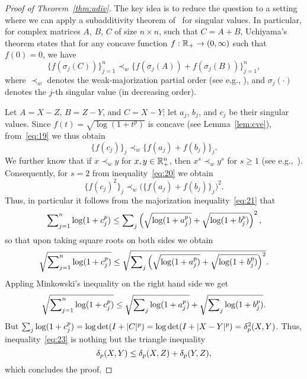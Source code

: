 \documentclass[11pt]{article}
\begin{document}
\begin{proof}[Proof of Theorem~{\ref{thm:adiv}}]
  The key idea is to reduce the question to a setting where we can apply a subadditivity theorem of~\citet{uchiyama2006} for singular values. In particular, for complex matrices $A$, $B$, $C$ of size $n\times n$, such that $C=A+B$, Uchiyama's theorem states that for any concave function $f: \mathbb{R}_+\to (0,\infty)$ such that $f(0)=0$, we have
  \begin{equation}
    \label{eq:19}
    \{f(\sigma_j(C))\}_{j=1}^n \prec_w \{f(\sigma_j(A))+ f(\sigma_j(B))\}_{j=1}^n,
  \end{equation}
  where $\prec_w$ denotes the weak-majorization partial order (see e.g., \citep[Chapter~2]{bhatia1997}), and $\sigma_j(\cdot)$ denotes the $j$-th singular value (in decreasing order).

  Let $A=X-Z$, $B=Z-Y$, and $C=X-Y$; let $a_j$, $b_j$, and $c_j$ be their singular values. Since $f(t)=\sqrt{\log(1+t^p)}$ is concave (see Lemma~\ref{lem:cve}), from~\eqref{eq:19} we thus obtain
  \begin{equation}
    \label{eq:20}
    \{f(c_j)\}_j \prec_w \{f(a_j) + f(b_j)\}_j.
  \end{equation}
  We further know that if $x \prec_w y$ for $x, y \in \mathbb{R}_+^n$, then $x^s \prec_w y^s$ for $s \ge 1$ (see e.g.,~\citep[Example II.3.5]{bhatia1997}). Consequently, for $s=2$ from inequality~\eqref{eq:20} we obtain
  \begin{equation}
    \label{eq:21}
    \{f(c_j)^2\}_j \prec_w \bigl(\{f(a_j) + f(b_j)\}_j\bigr)^2.
  \end{equation}
  Thus, in particular it follows from the majorization inequality~\eqref{eq:21} that
  \begin{equation}
    \label{eq:22}
    \sum\nolimits_{j=1}^n \log(1+c_j^p) \le \sum\nolimits_j \left(\sqrt{\log(1+a_j^p)} + \sqrt{\log(1+b_j^p)} \right)^2,
  \end{equation}
  so that upon taking square roots on both sides we obtain
  \begin{equation*}
    \sqrt{\sum\nolimits_{j=1}^n \log(1+c_j^p)} \le \sqrt{\sum\nolimits_j \left(\sqrt{\log(1+a_j^p)} + \sqrt{\log(1+b_j^p)} \right)^2}.
  \end{equation*}
  Appling Minkowski's inequality on the right hand side we get
  \begin{equation}
    \label{eq:23}
    \sqrt{\sum\nolimits_{j=1}^n \log(1+c_j^p)} \le \sqrt{\sum\nolimits_j \log(1+a_j^p)} + \sqrt{\sum\nolimits_j \log(1+b_j^p)}.
  \end{equation}
  But $\sum\nolimits_j\log(1+c_j^p)=\log\det(I+|C|^p)=\log\det(I+|X-Y|^p)=\delta_p^2(X,Y)$. Thus, inequality~\eqref{eq:23} is nothing but the triangle inequality
  \begin{equation*}
    \delta_p(X,Y) \le \delta_p(X,Z) + \delta_p(Y,Z),
  \end{equation*}
  which concludes the proof.
\end{proof}
\end{document}
